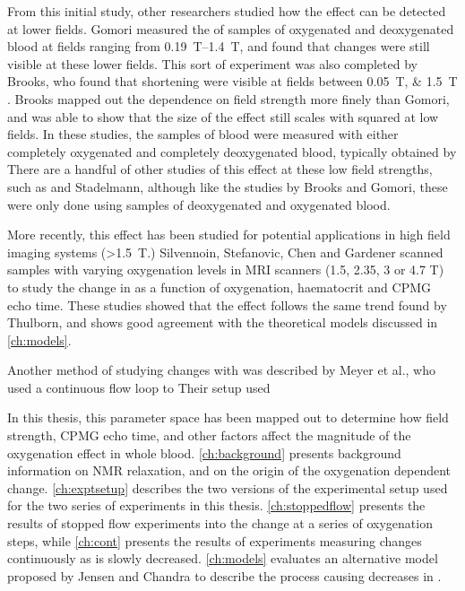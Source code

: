 From this initial study, other researchers studied how the effect can be detected at lower fields.
Gomori measured the \Ttwo of samples of oxygenated and deoxygenated blood at fields ranging from \SIrange{0.19}{1.4}{T}, and found that changes were still visible at these lower fields\cite{GomoriNMRRelaxationTimes1987}.
This sort of experiment was also completed by Brooks, who found that \Ttwo shortening were visible at fields between \SIlist{0.05;1.5}{T} \cite{BrooksComparisont2relaxation1995}.
Brooks mapped out the dependence on field strength more finely than Gomori, and was able to show that the size of the effect still scales with \Bzero squared at low fields.
In these studies, the samples of blood were measured with either completely oxygenated and completely deoxygenated blood, typically obtained by
There are a handful of other studies of this effect at these low field strengths, such as \cite{BryantMagneticrelaxationblood1990} and Stadelmann\cite{StadelmannRelaxationtimesvenous1991},
although like the studies by Brooks and Gomori, these were only done using samples of deoxygenated and oxygenated blood.


More recently, this effect has been studied for potential applications in high field imaging systems (\SI{>1.5}{T}.)
Silvennoin\cite{JohannaSilvennoinenBloodNMRrelaxation2002}, Stefanovic\cite{StefanovicHumanwholebloodrelaxometry2004}, Chen\cite{ChenHumanwholeblood2009} and Gardener\cite{GardenerDependencebloodR22010} scanned samples with varying oxygenation levels in MRI scanners (1.5, 2.35, 3 or 4.7 T) to study the change in \Ttwo as a function of oxygenation, haematocrit and CPMG echo time.
These studies showed that the effect follows the same trend found by Thulborn, and shows good agreement with the theoretical models discussed in \autoref{ch:models}.

Another method of studying \Ttwo changes with \SOtwo was described by Meyer et al., who used a continuous flow loop to
Their setup used

In this thesis, this parameter space has been mapped out to determine how field strength, CPMG echo time, and other factors affect the magnitude of the oxygenation
\Ttwo effect in whole blood.
\autoref{ch:background} presents background information on NMR relaxation, and on the origin of the oxygenation dependent \Ttwo change.
\autoref{ch:exptsetup} describes the two versions of the experimental setup used for the two series of experiments in this thesis.
\autoref{ch:stoppedflow} presents the results of stopped flow experiments into the \Ttwo change at a series of oxygenation steps, while \autoref{ch:cont} presents the results of experiments measuring \Ttwo changes continuously as \SOtwo is slowly decreased.
\autoref{ch:models} evaluates an alternative model proposed by Jensen and Chandra to describe the process causing decreases in \Ttwo\cite{JensenNMRrelaxationtissues2000}.
